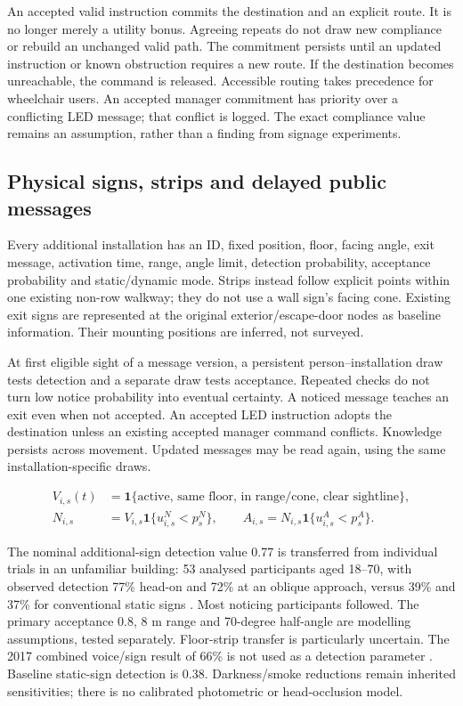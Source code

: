 \documentclass[11pt,a4paper]{article}
\begin{document}
An accepted valid instruction commits the destination and an explicit route. It is no longer merely a utility bonus. Agreeing repeats do not draw new compliance or rebuild an unchanged valid path. The commitment persists until an updated instruction or known obstruction requires a new route. If the destination becomes unreachable, the command is released. Accessible routing takes precedence for wheelchair users. An accepted manager commitment has priority over a conflicting LED message; that conflict is logged. The exact compliance value remains an assumption, rather than a finding from signage experiments.


\subsection{Physical signs, strips and delayed public messages}

Every additional installation has an ID, fixed position, floor, facing angle, exit message, activation time, range, angle limit, detection probability, acceptance probability and static/dynamic mode. Strips instead follow explicit points within one existing non-row walkway; they do not use a wall sign's facing cone. Existing exit signs are represented at the original exterior/escape-door nodes as baseline information. Their mounting positions are inferred, not surveyed.


At first eligible sight of a message version, a persistent person–installation draw tests detection and a separate draw tests acceptance. Repeated checks do not turn low notice probability into eventual certainty. A noticed message teaches an exit even when not accepted. An accepted LED instruction adopts the destination unless an existing accepted manager command conflicts. Knowledge persists across movement. Updated messages may be read again, using the same installation-specific draws.


\begin{equation}
\begin{aligned}
 V_{i,s}(t)&=\mathbf1\{\text{active, same floor, in range/cone, clear sightline}\},\\
 N_{i,s}&=V_{i,s}\mathbf1\{u^{N}_{i,s}<p_s^{N}\},\qquad
 A_{i,s}=N_{i,s}\mathbf1\{u^{A}_{i,s}<p_s^{A}\}.
\end{aligned}\tag{31}\label{eq:31}
\end{equation}

The nominal additional-sign detection value 0.77 is transferred from individual trials in an unfamiliar building: 53 analysed participants aged 18–70, with observed detection 77\% head-on and 72\% at an oblique approach, versus 39\% and 37\% for conventional static signs \cite{R24}. Most noticing participants followed. The primary acceptance 0.8, 8 m range and 70-degree half-angle are modelling assumptions, tested separately. Floor-strip transfer is particularly uncertain. The 2017 combined voice/sign result of 66\% is not used as a detection parameter \cite{R8}. Baseline static-sign detection is 0.38. Darkness/smoke reductions remain inherited sensitivities; there is no calibrated photometric or head-occlusion model.
\end{document}
